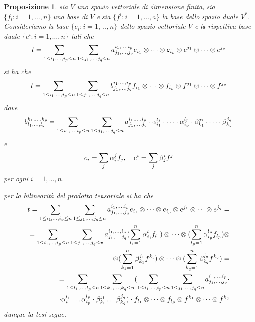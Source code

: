 \documentclass[oneside, 11pt]{amsbook}
\makeatletter
\newcommand{\0}{{(0)}}
\newcommand{\3}{{(3)}}
\theoremstyle{colonplain}
\newtheorem{prop}[thm]{Proposizione}
\theoremstyle{colondefinition}
\theoremstyle{colonremark}
\numberwithin{equation}{chapter}
\renewcommand{\proofname}{Dimostrazione}
\renewenvironment{proof}[1][\proofname]{\par
  \pushQED{\qed}%
  \normalfont \topsep6\p@\@plus6\p@\relax
  \trivlist
  \item[\hskip\labelsep\bfseries #1:]\ignorespaces
}{%
  \popQED\endtrivlist\@endpefalse
}
\makeatother
\begin{document}
\begin{prop} sia $V$ uno spazio vettoriale di dimensione finita, sia $\{ f_i : i = 1, \dots, n \}$ una base di $V$ e sia $\{ f^i : i = 1, \dots, n \}$ la base dello spazio duale $V^*$. Consideriamo la base $\{ e_i : i = 1, \dots, n \}$ dello spazio vettoriale $V$ e la rispettiva base duale $\{ e^i : i = 1, \dots, n \}$ tali che
\begin{align}
    t = \sum_{1 \leq i_1, \dots, i_p \leq n} \sum_{1 \leq j_1, \dots, j_q \leq n} a^{i_1, \dots, i_p}_{j_1, \dots, j_q} e_{i_1} \otimes \dots \otimes e_{i_p} \otimes e^{j_1} \otimes \dots \otimes e^{j_q} \notag
\end{align}
si ha che
\begin{align}
    t = \sum_{1 \leq i_1, \dots, i_p \leq n} \sum_{1 \leq j_1, \dots, j_q \leq n} b^{i_1, \dots, i_p}_{j_1, \dots, j_q} f_{i_1} \otimes \dots \otimes f_{i_p} \otimes f^{j_1} \otimes \dots \otimes f^{j_q} \notag
\end{align}
dove
\begin{align}
    b^{k_1, \dots, k_p}_{l_1, \dots, l_q} = \sum_{1 \leq i_1, \dots, i_p \leq n} \sum_{1 \leq j_1, \dots, j_q \leq n} a^{i_1, \dots, i_p}_{j_1, \dots, j_q} \cdot \alpha^{l_1}_{i_1} \cdot \dots \cdot \alpha^{l_p}_{i_p} \cdot \beta^{j_1}_{k_1} \cdot \dots \cdot \beta^{j_q}_{k_q} \notag
\end{align}
e
\begin{align}
    e_i = \sum_{j} \alpha_i^j f_j, \quad e^i = \sum_j \beta^i_j f^j \notag
\end{align}
per ogni $i = 1, \dots, n$. \\

\begin{proof} per la bilinearità del prodotto tensoriale si ha che
\begin{align*}
    t = \sum_{1 \leq i_1, \dots, i_p \leq n} \sum_{1 \leq j_1, \dots, j_q \leq n} a^{i_1, \dots, i_p}_{j_1, \dots, j_q} e_{i_1} \otimes \dots \otimes e_{i_p} \otimes e^{j_1} \otimes \dots \otimes e^{j_q} = \notag \\
    = \sum_{1 \leq i_1, \dots, i_p \leq n} \sum_{1 \leq j_1, \dots, j_q \leq n} a^{i_1, \dots, i_p}_{j_1, \dots, j_q} (\sum_{l_1 = 1}^n \alpha_{i_1}^{l_1}f_{l_1}) \otimes \dots \otimes (\sum_{l_p = 1}^n \alpha_{i_p}^{l_p}f_{l_p}) \otimes \notag \\
    \otimes (\sum_{k_1 = 1}^n \beta^{j_1}_{k_1} f^{k_1}) \otimes \dots \otimes (\sum_{k_q = 1}^n \beta^{j_q}_{k_q} f^{k_q}) \notag = \\
    = \sum_{1 \leq l_1, \dots, l_p \leq n} \sum_{1 \leq k_1, \dots, k_q \leq n} (\sum_{1 \leq i_1, \dots, i_p \leq n} \sum_{1 \leq j_1, \dots, j_q \leq n} a^{i_1, \dots, i_p}_{j_1, \dots, j_q} \cdot \notag \\ 
    \cdot \alpha^{l_1}_{i_1} \dots \alpha^{l_p}_{i_p} \cdot \beta^{j_1}_{k_1} \dots \beta^{j_q}_{k_q}) \cdot f_{l_1} \otimes \dots \otimes f_{l_p} \otimes f^{k_1} \otimes \dots \otimes f^{k_q} \notag
\end{align*}
dunque la tesi segue. \end{proof}
\end{prop}
\end{document}
